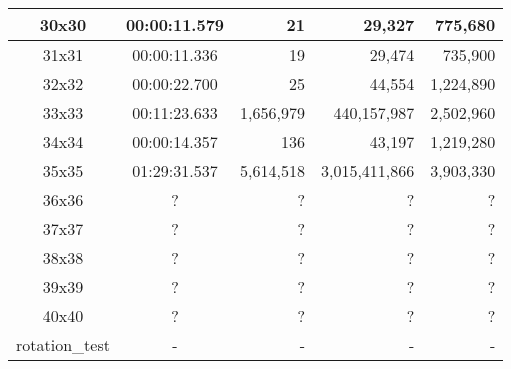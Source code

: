 \begin{center}
\begin{tabular}{|c|c|r|r|r|}
		30x30 & 00:00:11.579 & 21 & 29,327 & 775,680 \\ \hline
		31x31 & 00:00:11.336 & 19 & 29,474 & 735,900 \\ \hline
		32x32 & 00:00:22.700 & 25 & 44,554 & 1,224,890 \\ \hline
		33x33 & 00:11:23.633 & 1,656,979 & 440,157,987 & 2,502,960 \\ \hline
		34x34 & 00:00:14.357 & 136 & 43,197 & 1,219,280 \\ \hline
		35x35 & 01:29:31.537 & 5,614,518 & 3,015,411,866 & 3,903,330 \\ \hline
		36x36 & ? & ? & ? & ? \\ \hline
		37x37 & ? & ? & ? & ? \\ \hline
		38x38 & ? & ? & ? & ? \\ \hline
		39x39 & ? & ? & ? & ? \\ \hline
		40x40 & ? & ? & ? & ? \\ \hline
		rotation\_test & - & - & - & - \\ \hline

    \end{tabular}
\end{center}
